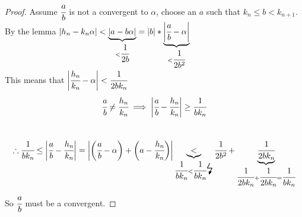 \documentclass[11pt]{article}
\begin{document}
\begin{proof}
	Assume $\cfrac{a}{b}$ is not a convergent to $\alpha$, choose an $a$ such that $k_n\leq b < k_{n+1}$. By the lemma $|h_n-k_n\alpha| < \underbrace{|a-b\alpha|}_{<\cfrac{1}{2b}} = |b| * \underbrace{\bigg|\cfrac{a}{b} - \alpha \bigg | }_{<\cfrac{1}{2b^2}}$
	\\[1em]
	This means that $\bigg| \cfrac{h_n}{k_n}-\alpha \bigg| < \cfrac{1}{2bk_n}$
	\begin{align*}
		\cfrac{a}{b} \neq \cfrac{h_n}{k_n} \implies \bigg| \cfrac{a}{b} -\cfrac{h_n}{k_n} \bigg | \geq \cfrac{1}{bk_n}\\[2em]
	\end{align*}
	\begin{align*}
		\therefore \cfrac{1}{bk_n} \leq \bigg | \cfrac{a}{b} - \cfrac{h_n}{k_n} \bigg | = \bigg | \bigg(\cfrac{a}{b}-\alpha \bigg) + \bigg(a-\cfrac{h_n}{k_n} \bigg) \bigg|  \underbrace{<}_{\cfrac{1}{bk_n} < \cfrac{1}{bk_n} \text{\LARGE \lightning }} \cfrac{1}{2b^2} + \underbrace{\cfrac{1}{2bk_n}}_{\cfrac{1}{2bk_n} + \cfrac{1}{2bk_n} = \cfrac{1}{bk_n}}
	\end{align*}
	So $\cfrac{a}{b}$ must be a convergent.
\end{proof}
\end{document}
